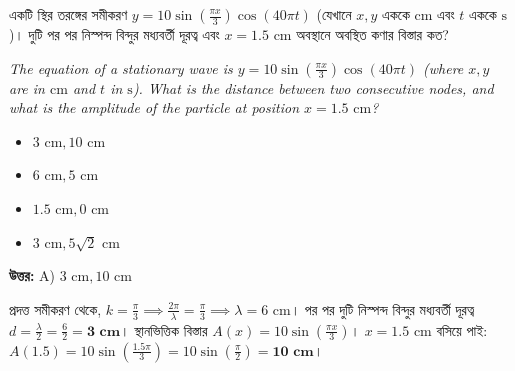 \documentclass[12pt, a4paper]{article}
\begin{document}
\vspace{2em}

\begin{tcolorbox}[questionbox={প্রশ্ন (Question) 12}]
    \noindent
    একটি স্থির তরঙ্গের সমীকরণ $y = 10 \sin \left(\frac{\pi x}{3}\right) \cos (40\pi t)$ (যেখানে $x, y$ এককে $\text{cm}$ এবং $t$ এককে $\text{s}$)। দুটি পর পর নিস্পন্দ বিন্দুর মধ্যবর্তী দূরত্ব এবং $x = 1.5\text{ cm}$ অবস্থানে অবস্থিত কণার বিস্তার কত?
    
    \vspace{0.8em}
    \begin{english}
    \noindent\textit{\color{darkgray}
    The equation of a stationary wave is $y = 10 \sin \left(\frac{\pi x}{3}\right) \cos (40\pi t)$ (where $x, y$ are in $\text{cm}$ and $t$ in $\text{s}$). What is the distance between two consecutive nodes, and what is the amplitude of the particle at position $x = 1.5\text{ cm}$?
    }
    \end{english}
\end{tcolorbox}

\begin{itemize}[label={}, leftmargin=1cm, itemsep=0.5em]
    \item[\textbf{A)}] $3\text{ cm}, 10\text{ cm}$
    \item[\textbf{B)}] $6\text{ cm}, 5\text{ cm}$
    \item[\textbf{C)}] $1.5\text{ cm}, 0\text{ cm}$
    \item[\textbf{D)}] $3\text{ cm}, 5\sqrt{2}\text{ cm}$
\end{itemize}

\vspace{0.5em}
\begin{tcolorbox}[answerbox]
    \textbf{\color{success} উত্তর:} A) $3\text{ cm}, 10\text{ cm}$
\end{tcolorbox}
\vspace{1em}

\begin{tcolorbox}[solutionbox={সমাধান (Solution)}]
    \noindent
    প্রদত্ত সমীকরণ থেকে, $k = \frac{\pi}{3} \implies \frac{2\pi}{\lambda} = \frac{\pi}{3} \implies \lambda = 6\text{ cm}$। পর পর দুটি নিস্পন্দ বিন্দুর মধ্যবর্তী দূরত্ব $d = \frac{\lambda}{2} = \frac{6}{2} = \mathbf{3\text{ cm}}$। স্থানভিত্তিক বিস্তার $A(x) = 10 \sin \left(\frac{\pi x}{3}\right)$। $x = 1.5\text{ cm}$ বসিয়ে পাই: $A(1.5) = 10 \sin \left(\frac{1.5\pi}{3}\right) = 10 \sin \left(\frac{\pi}{2}\right) = \mathbf{10\text{ cm}}$।
\end{tcolorbox}
\end{document}
